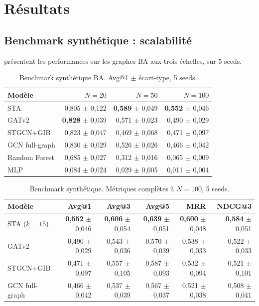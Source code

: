 \documentclass[a4paper,11pt,oneside]{report}
\begin{document}
\chapter{R\'esultats}
\label{chap:resultats}

\section{Benchmark synth\'etique : scalabilit\'e}
\label{sec:resultats-sim}

 pr\'esentent les performances sur les graphes BA aux trois \'echelles, sur 5 seeds.

\begin{table}[ht]
\centering
\caption{Benchmark synth\'etique BA. Avg@1 $\pm$ \'ecart-type, 5 seeds.}
\label{tab:sim-summary}
\begin{tabular}{lrrr}
\toprule
Mod\`ele & $N{=}20$ & $N{=}50$ & $N{=}100$ \\
\midrule
STA & 0{,}805 $\pm$ 0{,}122 & \textbf{0{,}589} $\pm$ 0{,}049 & \textbf{0{,}552} $\pm$ 0{,}046 \\
GATv2 & \textbf{0{,}828} $\pm$ 0{,}039 & 0{,}571 $\pm$ 0{,}023 & 0{,}490 $\pm$ 0{,}029 \\
STGCN+GIB & 0{,}823 $\pm$ 0{,}047 & 0{,}469 $\pm$ 0{,}068 & 0{,}471 $\pm$ 0{,}097 \\
GCN full-graph & 0{,}830 $\pm$ 0{,}029 & 0{,}526 $\pm$ 0{,}026 & 0{,}466 $\pm$ 0{,}042 \\
Random Forest & 0{,}685 $\pm$ 0{,}027 & 0{,}312 $\pm$ 0{,}016 & 0{,}065 $\pm$ 0{,}009 \\
MLP & 0{,}084 $\pm$ 0{,}024 & 0{,}029 $\pm$ 0{,}005 & 0{,}011 $\pm$ 0{,}004 \\
\bottomrule
\end{tabular}
\end{table}

\begin{table}[ht]
\centering
\caption{Benchmark synth\'etique. M\'etriques compl\`etes \`a $N{=}100$, 5 seeds.}
\label{tab:sim-n100}
\begin{tabular}{lrrrrr}
\toprule
Mod\`ele & Avg@1 & Avg@3 & Avg@5 & MRR & NDCG@3 \\
\midrule
STA ($k{=}15$) & \textbf{0{,}552} $\pm$ 0{,}046 & \textbf{0{,}606} $\pm$ 0{,}054 & \textbf{0{,}639} $\pm$ 0{,}051 & \textbf{0{,}600} $\pm$ 0{,}048 & \textbf{0{,}584} $\pm$ 0{,}051 \\
GATv2 & 0{,}490 $\pm$ 0{,}029 & 0{,}543 $\pm$ 0{,}036 & 0{,}570 $\pm$ 0{,}039 & 0{,}538 $\pm$ 0{,}033 & 0{,}522 $\pm$ 0{,}033 \\
STGCN+GIB & 0{,}471 $\pm$ 0{,}097 & 0{,}557 $\pm$ 0{,}105 & 0{,}587 $\pm$ 0{,}093 & 0{,}532 $\pm$ 0{,}094 & 0{,}521 $\pm$ 0{,}101 \\
GCN full-graph & 0{,}466 $\pm$ 0{,}042 & 0{,}537 $\pm$ 0{,}039 & 0{,}567 $\pm$ 0{,}037 & 0{,}521 $\pm$ 0{,}038 & 0{,}508 $\pm$ 0{,}041 \\
\bottomrule
\end{tabular}
\end{table}
\end{document}
